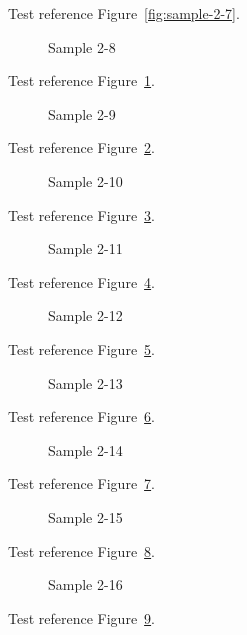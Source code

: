 Test reference Figure~\ref{fig:sample-2-7}.

\begin{figure}[tbhp]
\caption{Sample 2-8}
\label{fig:sample-2-8}
\end{figure}

Test reference Figure~\ref{fig:sample-2-8}.

\begin{figure}[tbhp]
\caption{Sample 2-9}
\label{fig:sample-2-9}
\end{figure}

Test reference Figure~\ref{fig:sample-2-9}.

\begin{figure}[tbhp]
\caption{Sample 2-10}
\label{fig:sample-2-10}
\end{figure}

Test reference Figure~\ref{fig:sample-2-10}.

\begin{figure}[tbhp]
\caption{Sample 2-11}
\label{fig:sample-2-11}
\end{figure}

Test reference Figure~\ref{fig:sample-2-11}.

\begin{figure}[tbhp]
\caption{Sample 2-12}
\label{fig:sample-2-12}
\end{figure}

Test reference Figure~\ref{fig:sample-2-12}.

\begin{figure}[tbhp]
\caption{Sample 2-13}
\label{fig:sample-2-13}
\end{figure}

Test reference Figure~\ref{fig:sample-2-13}.

\begin{figure}[tbhp]
\caption{Sample 2-14}
\label{fig:sample-2-14}
\end{figure}

Test reference Figure~\ref{fig:sample-2-14}.

\begin{figure}[tbhp]
\caption{Sample 2-15}
\label{fig:sample-2-15}
\end{figure}

Test reference Figure~\ref{fig:sample-2-15}.

\begin{figure}[tbhp]
\caption{Sample 2-16}
\label{fig:sample-2-16}
\end{figure}

Test reference Figure~\ref{fig:sample-2-16}.


